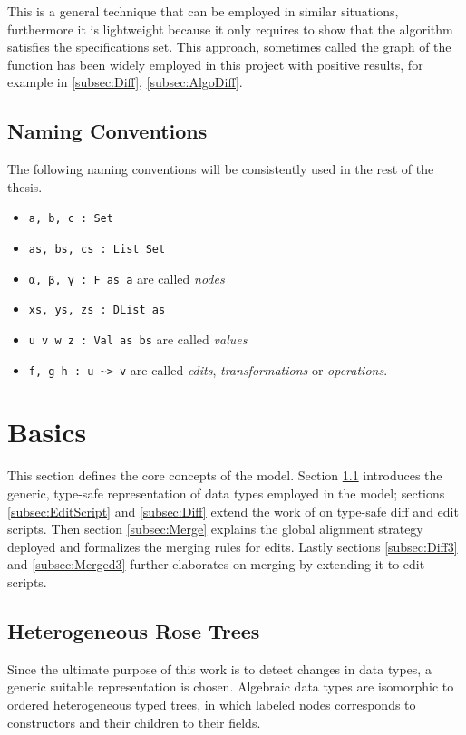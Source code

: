 \documentclass[../Thesis.tex]{subfiles}
\begin{document}
	This is a general technique that can be employed in similar 
	situations, furthermore it is lightweight because it only requires 
	to show that the algorithm satisfies the specifications set.
	This approach, sometimes called the graph of the function 
	\cite{FunctionDomains} has been widely employed in this project with 
	positive results, for example in \ref{subsec:Diff}, \ref{subsec:AlgoDiff}.
	
	\subsection{Naming Conventions}
	The following naming conventions will be consistently used in the rest of  
	the thesis.
	\begin{itemize}
		\item \texttt{a, b, c :\ Set}
		\item \texttt{as, bs, cs :\ List Set}
		\item \texttt{α, β, γ :\ F as a} are called \emph{nodes}
		\item \texttt{xs, ys, zs :\ DList as}
		\item \texttt{u v w z :\ Val as bs} are called \emph{values}
		\item \texttt{f, g h :\ u \textasciitilde> v} are called  \emph{edits},
		\emph{transformations} or \emph{operations}.
	\end{itemize}

\section{Basics}
This section defines the core concepts of the model.
Section \ref{subsec:DTree} introduces the generic, type-safe representation of data types employed in the model; sections \ref{subsec:EditScript} and
\ref{subsec:Diff} extend the work of \cite{Lemp09} on type-safe diff and
edit scripts. Then section \ref{subsec:Merge} explains the global
alignment strategy deployed and formalizes the merging rules 
for edits. Lastly sections \ref{subsec:Diff3} and \ref{subsec:Merged3} further elaborates on merging by extending it to edit scripts.

	\subsection{Heterogeneous Rose Trees}
	\label{subsec:DTree}
		Since the ultimate purpose of this work is to detect changes in 
		data types, a generic suitable representation is chosen. 
		Algebraic data types are isomorphic to ordered heterogeneous typed 
		trees, in which labeled nodes corresponds to constructors and
		their children to their fields. 
		
\end{document}
